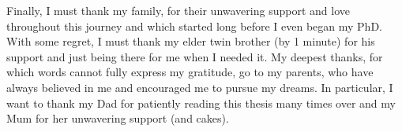 Finally, I must thank my family, for their unwavering support and love throughout this journey and which started long before I even began my PhD. With some regret, I must thank my elder twin brother (by 1 minute) for his support and just being there for me when I needed it. My deepest thanks, for which words cannot fully express my gratitude, go to my parents, who have always believed in me and encouraged me to pursue my dreams. In particular, I want to thank my Dad for patiently reading this thesis many times over and my Mum for her unwavering support (and cakes).
